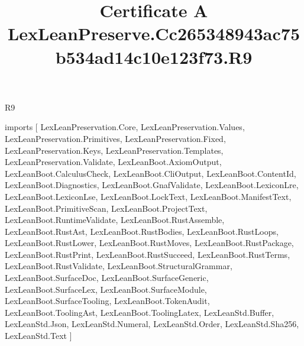 \begin{lexlean}{R9}
\title{Certificate A LexLeanPreserve.Cc265348943ac75b534ad14c10e123f73.R9}
\begin{coremodule}
imports [
  LexLeanPreservation.Core,
  LexLeanPreservation.Values,
  LexLeanPreservation.Primitives,
  LexLeanPreservation.Fixed,
  LexLeanPreservation.Keys,
  LexLeanPreservation.Templates,
  LexLeanPreservation.Validate,
  LexLeanBoot.AxiomOutput,
  LexLeanBoot.CalculusCheck,
  LexLeanBoot.CliOutput,
  LexLeanBoot.ContentId,
  LexLeanBoot.Diagnostics,
  LexLeanBoot.GnafValidate,
  LexLeanBoot.LexiconLre,
  LexLeanBoot.LexiconLse,
  LexLeanBoot.LockText,
  LexLeanBoot.ManifestText,
  LexLeanBoot.PrimitiveScan,
  LexLeanBoot.ProjectText,
  LexLeanBoot.RuntimeValidate,
  LexLeanBoot.RustAssemble,
  LexLeanBoot.RustAst,
  LexLeanBoot.RustBodies,
  LexLeanBoot.RustLoops,
  LexLeanBoot.RustLower,
  LexLeanBoot.RustMoves,
  LexLeanBoot.RustPackage,
  LexLeanBoot.RustPrint,
  LexLeanBoot.RustSucceed,
  LexLeanBoot.RustTerms,
  LexLeanBoot.RustValidate,
  LexLeanBoot.StructuralGrammar,
  LexLeanBoot.SurfaceDoc,
  LexLeanBoot.SurfaceGeneric,
  LexLeanBoot.SurfaceLex,
  LexLeanBoot.SurfaceModule,
  LexLeanBoot.SurfaceTooling,
  LexLeanBoot.TokenAudit,
  LexLeanBoot.ToolingAst,
  LexLeanBoot.ToolingLatex,
  LexLeanStd.Buffer,
  LexLeanStd.Json,
  LexLeanStd.Numeral,
  LexLeanStd.Order,
  LexLeanStd.Sha256,
  LexLeanStd.Text
]


\end{coremodule}
\end{lexlean}
